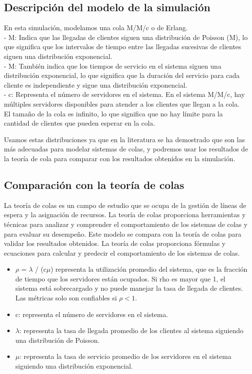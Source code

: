 \documentclass[11pt]{article}
\begin{document}
    \subsection{Descripción del modelo de la simulación}
    En esta simulación, modelamos una cola M/M/c o de Erlang. \\
- M: Indica que las llegadas de clientes siguen una distribución de Poisson (M), lo que significa que los intervalos de tiempo entre las llegadas sucesivas de clientes siguen una distribución exponencial.\\
- M: También indica que los tiempos de servicio en el sistema siguen una distribución exponencial, lo que significa que la duración del servicio para cada cliente es independiente y sigue una distribución exponencial.\\
- c: Representa el número de servidores en el sistema. En el sistema M/M/c, hay múltiples servidores disponibles para atender a los clientes que llegan a la cola.\\
El tamaño de la cola es infinito, lo que significa que no hay límite para la cantidad de clientes que pueden esperar en la cola.

Usamos estas distribuciones ya que en la literatura se ha demostrado que son las más adecuadas para modelar sistemas de colas, y podremos usar los resultados de la teoría de cola para comparar con los resultados obtenidos en la simulación.

    \subsection{Comparación con la teoría de colas}
    La teoría de colas es un campo de estudio que se ocupa de la gestión de líneas de espera y la asignación de recursos.
    La teoría de colas proporciona herramientas y técnicas para analizar y comprender el comportamiento de los sistemas de
    colas y para evaluar su desempeño.
    Este modelo se compara con la teoría de colas para validar los resultados obtenidos. La
    teoría de colas proporciona fórmulas y ecuaciones para calcular y predecir el comportamiento de los sistemas de colas.


    \begin{itemize}
        \item $\rho$ = $\lambda$ / (c$\mu$) representa la utilización promedio del sistema, que es la fracción de tiempo que los servidores están ocupados. Si rho es mayor que 1, el sistema está sobrecargado y no puede manejar la tasa de llegada de clientes. Las métricas solo son confiables si $\rho < 1$.
        \item c: representa el número de servidores en el sistema.
        \item $\lambda$: representa la tasa de llegada promedio de los clientes al sistema siguiendo una distribución de Poisson.
        \item $\mu$: representa la tasa de servicio promedio de los servidores en el sistema siguiendo una distribución exponencial.
    \end{itemize}
\end{document}
